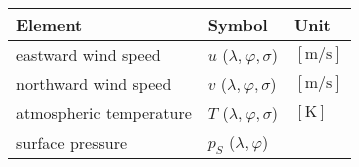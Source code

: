 \setlength\LTleft{0pt}\setlength\LTright{0pt}\begin{longtable}[]{@{}lll@{}}
\toprule\relax
\begin{minipage}[b]{0.30\columnwidth}\raggedright
Element\strut
\end{minipage} & \begin{minipage}[b]{0.30\columnwidth}\raggedright
Symbol\strut
\end{minipage} & \begin{minipage}[b]{0.30\columnwidth}\raggedright
Unit\strut
\end{minipage}\tabularnewline
\midrule\relax
\endhead
\begin{minipage}[t]{0.30\columnwidth}\raggedright
eastward wind speed\strut
\end{minipage} & \begin{minipage}[t]{0.30\columnwidth}\raggedright
\(u\) (\(\lambda,\varphi,\sigma\))\strut
\end{minipage} & \begin{minipage}[t]{0.30\columnwidth}\raggedright
\(\mathrm{[m/s]}\)\strut
\end{minipage}\tabularnewline
\begin{minipage}[t]{0.30\columnwidth}\raggedright
northward wind speed\strut
\end{minipage} & \begin{minipage}[t]{0.30\columnwidth}\raggedright
\(v\) (\(\lambda,\varphi,\sigma\))\strut
\end{minipage} & \begin{minipage}[t]{0.30\columnwidth}\raggedright
\(\mathrm{[m/s]}\)\strut
\end{minipage}\tabularnewline
\begin{minipage}[t]{0.30\columnwidth}\raggedright
atmospheric temperature\strut
\end{minipage} & \begin{minipage}[t]{0.30\columnwidth}\raggedright
\(T\) (\(\lambda,\varphi,\sigma\))\strut
\end{minipage} & \begin{minipage}[t]{0.30\columnwidth}\raggedright
\(\mathrm{[K]}\)\strut
\end{minipage}\tabularnewline
\begin{minipage}[t]{0.30\columnwidth}\raggedright
surface pressure\strut
\end{minipage} & \begin{minipage}[t]{0.30\columnwidth}\raggedright
\(p_S\) (\(\lambda,\varphi\))\strut
\end{minipage} & \begin{minipage}[t]{0.30\columnwidth}\raggedright

\end{minipage}
\end{longtable}
